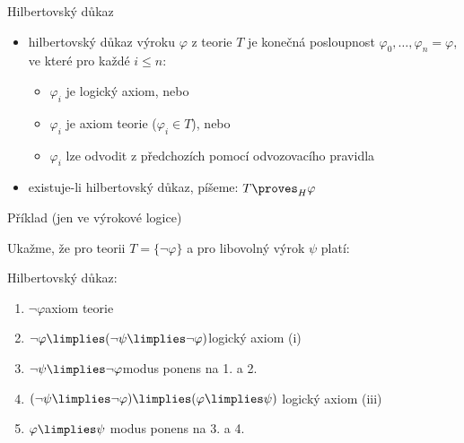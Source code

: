 \documentclass{beamer}
\begin{document}
\begin{frame}{Hilbertovský důkaz}

    \begin{itemize}[<+->]
        \item \alert{hilbertovský důkaz} výroku $\varphi$ z teorie $T$ je \alert{konečná} posloupnost $\varphi_0, \dots, \varphi_n=\varphi$, ve které pro každé $i\le n$:
        \begin{itemize}
        \item $\varphi_i$ je \alert{logický axiom}, nebo
        \item $\varphi_i$ je \alert{axiom teorie} ($\varphi_i \in T$), nebo
        \item $\varphi_i$ lze odvodit z předchozích pomocí \alert{odvozovacího pravidla}
        \end{itemize}
        \item existuje-li hilbertovský důkaz, píšeme: \alert{$T\proves_H\varphi$}
    \end{itemize}

\end{frame}


\begin{frame}{Příklad (jen ve výrokové logice)}

    \pause
    Ukažme, že pro teorii $T=\{\neg\varphi\}$ a pro libovolný výrok $\psi$ platí:  

    \pause
    Hilbertovský důkaz:
    
    \begin{enumerate}\it
        \item $\neg\varphi$\hfill axiom teorie
        \item $\neg \varphi \limplies (\neg \psi \limplies \neg \varphi)$\hfill logický axiom (i)
        \item $\neg \psi \limplies \neg \varphi$\hfill modus ponens na 1. a 2.
        \item $(\neg \psi \limplies \neg \varphi)\limplies(\varphi \limplies \psi)$ \hfill logický axiom (iii)
        \item $\varphi \limplies \psi$ \hfill modus ponens na 3. a 4.
    \end{enumerate}    

\end{frame}
\end{document}
